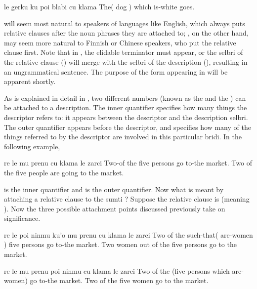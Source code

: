 \begin{example}
le gerku ku poi blabi cu klama\n
The( dog ) which is-white goes.
\end{example}

 will seem most natural to
    speakers of languages like English, which always puts relative
    clauses after the noun phrases they are attached to; , on the other hand, may seem more
    natural to Finnish or Chinese speakers, who put the relative
    clause first. Note that in , the
    elidable terminator  must appear, or the selbri of the
    relative clause () will merge with the selbri of the
    description (), resulting in an ungrammatical
    sentence. The purpose of the form appearing in  will be apparent shortly. 

As is explained in detail in , two different numbers (known as the 
    and the ) can be attached to a description.
    The inner quantifier specifies how many things the descriptor
    refers to: it appears between the descriptor and the
    description selbri. The outer quantifier appears before the
    descriptor, and specifies how many of the things referred to by
    the descriptor are involved in this particular bridi. In the
    following example,
\begin{example}
re le mu prenu cu klama le zarci\n
Two-of the five persons go to-the market.\n
Two of the five people \n
\T	are going to the market.
\end{example}

 is the inner quantifier and  is the outer
    quantifier. Now what is meant by attaching a relative clause to
    the sumti ? Suppose the relative clause is
     (meaning ). Now the three
    possible attachment points discussed previously take on
    significance.
\begin{example}
re le poi ninmu ku'o mu prenu\n
\T	cu klama le zarci\n
Two of the such-that( are-women )\n
\T	five persons go to-the market.\n
Two women out of the five persons go to the market.
\end{example}

\begin{example}
re le mu prenu poi ninmu \n
\T	cu klama le zarci\n
Two of the (five persons which are-women)\n
\T	go to-the market.\n
Two of the five women go to the market.
\end{example}

